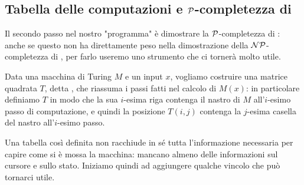 \subsection{Tabella delle computazioni e 
  \texorpdfstring{$\P$-completezza di \CVAL}{P-completezza di CIRCUIT-VALUE}}

Il secondo passo nel nostro "programma" è dimostrare la $\P$-completezza di \CVAL:
anche se questo non ha direttamente peso nella dimostrazione della
$\NP$-completezza di \CSAT, per farlo useremo uno strumento che ci tornerà molto
utile.

Data una macchina di Turing $M$ e un input $x$, vogliamo costruire una matrice
quadrata $T$, detta , che riassuma i passi fatti
nel calcolo di $M(x)$: in particolare definiamo $T$ in modo che la sua $i$-esima
riga contenga il nastro di $M$ all'$i$-esimo passo di computazione, e quindi
la posizione $T(i, j)$ contenga la $j$-esima casella del nastro all'$i$-esimo
passo.

Una tabella così definita non racchiude in sé tutta l'informazione necessaria
per capire come si è mossa la macchina: mancano almeno delle informazioni sul 
cursore e sullo stato. 
Iniziamo quindi ad aggiungere qualche vincolo che può tornarci utile. 

